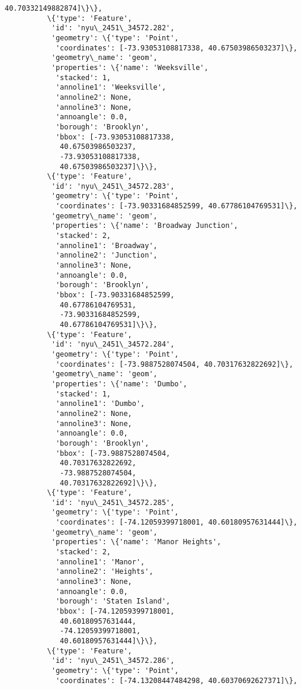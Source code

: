 \documentclass[11pt]{article}
\begin{document}
\begin{Verbatim}[commandchars=\\\{\}]
             40.70332149882874]\}\},
          \{'type': 'Feature',
           'id': 'nyu\_2451\_34572.282',
           'geometry': \{'type': 'Point',
            'coordinates': [-73.93053108817338, 40.67503986503237]\},
           'geometry\_name': 'geom',
           'properties': \{'name': 'Weeksville',
            'stacked': 1,
            'annoline1': 'Weeksville',
            'annoline2': None,
            'annoline3': None,
            'annoangle': 0.0,
            'borough': 'Brooklyn',
            'bbox': [-73.93053108817338,
             40.67503986503237,
             -73.93053108817338,
             40.67503986503237]\}\},
          \{'type': 'Feature',
           'id': 'nyu\_2451\_34572.283',
           'geometry': \{'type': 'Point',
            'coordinates': [-73.90331684852599, 40.67786104769531]\},
           'geometry\_name': 'geom',
           'properties': \{'name': 'Broadway Junction',
            'stacked': 2,
            'annoline1': 'Broadway',
            'annoline2': 'Junction',
            'annoline3': None,
            'annoangle': 0.0,
            'borough': 'Brooklyn',
            'bbox': [-73.90331684852599,
             40.67786104769531,
             -73.90331684852599,
             40.67786104769531]\}\},
          \{'type': 'Feature',
           'id': 'nyu\_2451\_34572.284',
           'geometry': \{'type': 'Point',
            'coordinates': [-73.9887528074504, 40.70317632822692]\},
           'geometry\_name': 'geom',
           'properties': \{'name': 'Dumbo',
            'stacked': 1,
            'annoline1': 'Dumbo',
            'annoline2': None,
            'annoline3': None,
            'annoangle': 0.0,
            'borough': 'Brooklyn',
            'bbox': [-73.9887528074504,
             40.70317632822692,
             -73.9887528074504,
             40.70317632822692]\}\},
          \{'type': 'Feature',
           'id': 'nyu\_2451\_34572.285',
           'geometry': \{'type': 'Point',
            'coordinates': [-74.12059399718001, 40.60180957631444]\},
           'geometry\_name': 'geom',
           'properties': \{'name': 'Manor Heights',
            'stacked': 2,
            'annoline1': 'Manor',
            'annoline2': 'Heights',
            'annoline3': None,
            'annoangle': 0.0,
            'borough': 'Staten Island',
            'bbox': [-74.12059399718001,
             40.60180957631444,
             -74.12059399718001,
             40.60180957631444]\}\},
          \{'type': 'Feature',
           'id': 'nyu\_2451\_34572.286',
           'geometry': \{'type': 'Point',
            'coordinates': [-74.13208447484298, 40.60370692627371]\},

\end{Verbatim}
\end{document}
